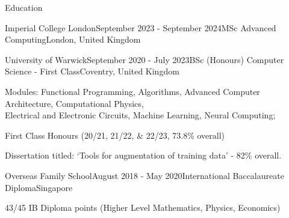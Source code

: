\documentclass{resume}
\begin{document}
    \begin{rSection}{Education}
        \begin{rSubsection}{Imperial College London}{September 2023 - September 2024}{MSc Advanced Computing}{London, United Kingdom}{}
            \item 
        \end{rSubsection}
        \begin{rSubsection}{University of Warwick}{September 2020 - July 2023}{BSc (Honours) Computer Science - First Class}{Coventry, United Kingdom}{}
        \item Modules: Functional Programming, Algorithms, Advanced Computer Architecture, Computational Physics, \\Electrical and Electronic Circuits, Machine Learning, Neural Computing;
        \item First Class Honours (20/21, 21/22, \& 22/23, 73.8\% overall)
        \item Dissertation titled: `Tools for augmentation of training data' - 82\% overall.
        \end{rSubsection}
        \begin{rSubsection}{Overseas Family School}{August 2018 - May 2020}{International Baccalaureate Diploma}{Singapore}{}
        \item 43/45 IB Diploma points (Higher Level Mathematics, Physics, Economics)
        \end{rSubsection}
    \end{rSection} 
\end{document}
